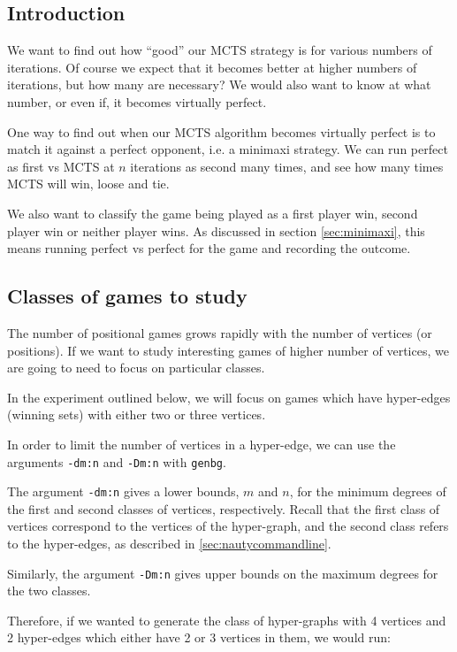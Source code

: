 \subsection{Introduction}


We want to find out how ``good'' our MCTS strategy is for various numbers of iterations.
Of course we expect that it becomes better at higher numbers of iterations, but how many are necessary?
We would also want to know at what number, or even if, it becomes virtually perfect.


One way to find out when our MCTS algorithm becomes virtually perfect is to match it against a perfect opponent, i.e. a minimaxi strategy.
We can run perfect as first vs MCTS at $n$ iterations as second many times, and see how many times MCTS will win, loose and tie.

We also want to classify the game being played as a first player win, second player win or neither player wins.
As discussed in section \ref{sec:minimaxi}, this means running perfect vs perfect for the game and recording the outcome.


\subsection{Classes of games to study}

The number of positional games grows rapidly with the number of vertices (or positions).
If we want to study interesting games of higher number of vertices, we are going to need to focus on particular classes.

In the experiment outlined below, we will focus on games which have hyper-edges (winning sets) with either two or three vertices.

In order to limit the number of vertices in a hyper-edge, we can use the arguments \texttt{-dm:n} and \texttt{-Dm:n} with \texttt{genbg}.

The argument \texttt{-dm:n} gives a lower bounds, $m$ and $n$, for the minimum degrees of the first and second classes of vertices, respectively.
Recall that the first class of vertices correspond to the vertices of the hyper-graph, and the second class refers to the hyper-edges, as described in \ref{sec:nautycommandline}.

Similarly, the argument \texttt{-Dm:n} gives upper bounds on the maximum degrees for the two classes.

Therefore, if we wanted to generate the class of hyper-graphs with 4 vertices and 2 hyper-edges which either have 2 or 3 vertices in them, we would run:

